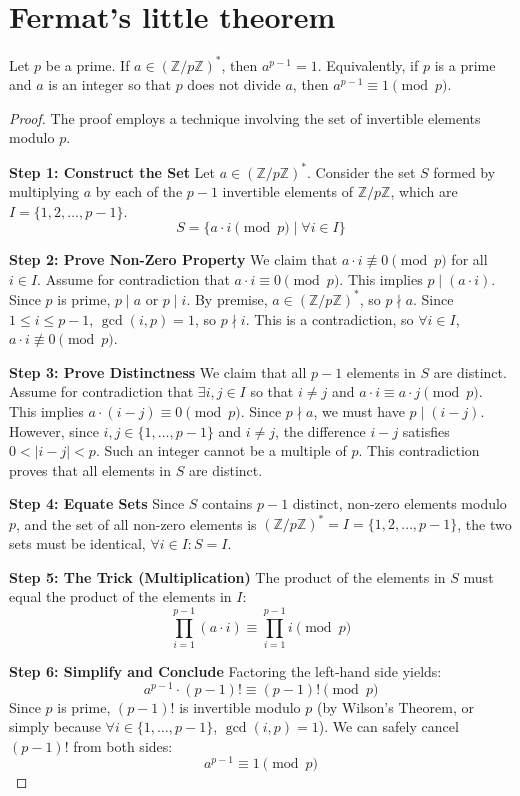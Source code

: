 \section{Fermat's little theorem}

\begin{theorem}
Let $p$ be a prime. If $a \in (\mathbb{Z}/p\mathbb{Z})^*$, then $a^{p-1} = 1$.
Equivalently, if $p$ is a prime and $a$ is an integer so that $p$ does not divide $a$, then $a^{p-1} \equiv 1 \pmod{p}$.
\end{theorem}
\begin{proof}
The proof employs a technique involving the set of invertible elements modulo $p$.

\textbf{Step 1: Construct the Set}
Let $a \in (\mathbb{Z}/p\mathbb{Z})^*$. Consider the set $S$ formed by multiplying $a$ by each of the $p-1$ invertible elements of $\mathbb{Z}/p\mathbb{Z}$, which are $I = \{1, 2, \ldots, p-1\}$.
$$
S = \{ a \cdot i \pmod{p} \mid \forall i \in I \}
$$

\textbf{Step 2: Prove Non-Zero Property}
We claim that $a \cdot i \not\equiv 0 \pmod{p}$ for all $i \in I$.
Assume for contradiction that $a \cdot i \equiv 0 \pmod{p}$. This implies $p \mid (a \cdot i)$. Since $p$ is prime, $p \mid a$ or $p \mid i$.
By premise, $a \in (\mathbb{Z}/p\mathbb{Z})^*$, so $p \nmid a$.
Since $1 \le i \le p-1$, $\gcd(i, p) = 1$, so $p \nmid i$.
This is a contradiction, so $\forall i \in I$, $a \cdot i \not\equiv 0 \pmod{p}$.

\textbf{Step 3: Prove Distinctness}
We claim that all $p-1$ elements in $S$ are distinct.
Assume for contradiction that $\exists i, j \in I$ so that $i \ne j$ and $a \cdot i \equiv a \cdot j \pmod{p}$.
This implies $a \cdot (i-j) \equiv 0 \pmod{p}$. Since $p \nmid a$, we must have $p \mid (i-j)$.
However, since $i, j \in \{1, \ldots, p-1\}$ and $i \ne j$, the difference $i-j$ satisfies $0 < |i-j| < p$. Such an integer cannot be a multiple of $p$.
This contradiction proves that all elements in $S$ are distinct.

\textbf{Step 4: Equate Sets}
Since $S$ contains $p-1$ distinct, non-zero elements modulo $p$, and the set of all non-zero elements is $(\mathbb{Z}/p\mathbb{Z})^* = I = \{1, 2, \ldots, p-1\}$, the two sets must be identical, $\forall i \in I : S = I$.

\textbf{Step 5: The Trick (Multiplication)}
The product of the elements in $S$ must equal the product of the elements in $I$:
$$
\prod_{i=1}^{p-1} (a \cdot i) \equiv \prod_{i=1}^{p-1} i \pmod{p}
$$

\textbf{Step 6: Simplify and Conclude}
Factoring the left-hand side yields:
$$
a^{p-1} \cdot (p-1)! \equiv (p-1)! \pmod{p}
$$
Since $p$ is prime, $(p-1)!$ is invertible modulo $p$ (by Wilson's Theorem, or simply because $\forall i \in \{1, \ldots, p-1\}$, $\gcd(i, p)=1$). We can safely cancel $(p-1)!$ from both sides:
$$
a^{p-1} \equiv 1 \pmod{p}
$$
\end{proof}

